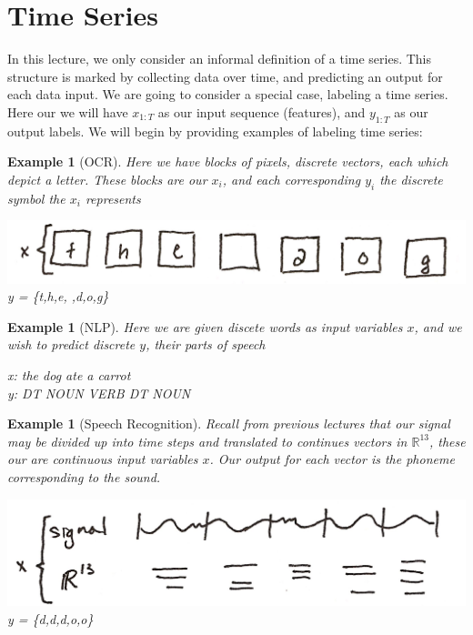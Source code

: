 \documentclass{article}
\newcommand{\R}{\mathbb{R}}
\newtheorem{example}[theorem]{Example}
\begin{document}
\section{Time Series}
In this lecture, we only consider an informal definition of a time series. This structure is marked by collecting data over time, and predicting an output for each data input.
We are going to consider a special case, labeling a time series. Here our we will have $x_{1:T}$ as our input sequence (features), and $y_{1:T}$ as our output labels. We will begin by providing examples of labeling time series:
\begin{example}[OCR]
Here we have blocks of pixels, discrete vectors, each which depict a letter. These blocks are our $x_i$, and each corresponding $y_i$ the discrete symbol the $x_i$ represents
\begin{center}
\includegraphics[scale=.1]{OCR} \\
y = \{t,h,e, ,d,o,g\}
\end{center}
\end{example}
\begin{example}[NLP]
Here we are given discete words as input variables $x$, and we wish to predict discrete $y$, their parts of speech
\begin{center}
x: the dog ate a carrot \\
y: DT NOUN VERB DT NOUN
\end{center}
\end{example}
\begin{example}[Speech Recognition]
Recall from previous lectures that our signal may be divided up into time steps and translated to continues vectors in $\R^{13}$, these our are continuous input variables $x$. Our output for each vector is the phoneme corresponding to the sound.
\begin{center}
\includegraphics[scale=.1]{SpeechRec} \\
y = \{d,d,d,o,o\}
\end{center}
\end{example}
\end{document}

